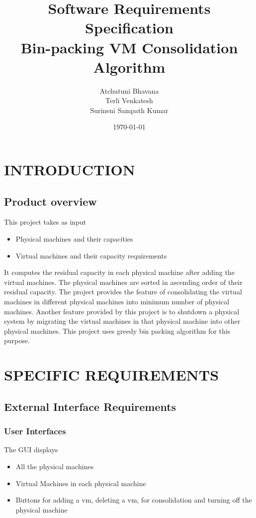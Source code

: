 \documentclass[a4paper,11pt]{article}
\title{Software Requirements Specification \\ Bin-packing VM Consolidation Algorithm}
\author{Atchutuni Bhavana \\ Terli Venkatesh \\ Surineni Sampath Kumar}
\date{\today}
\begin{document}
	\maketitle
	 \pagebreak 
	 \tableofcontents
	 \pagebreak 

	\section{INTRODUCTION}
		\subsection{Product overview}
		This project takes as  input 
		\begin{itemize}
		  \item Physical machines and their capacities
		  \item Virtual machines and their capacity requirements
		  
		\end{itemize} 
		It computes the residual capacity in each physical machine after adding the 
		virtual machines. The physical machines are sorted in ascending order of their residual capacity. 
		The project provides the feature of consolidating the virtual machines in different physical machines into 
		minimum number of physical machines. Another feature provided by this project is to shutdown a physical system
		by migrating the virtual machines in that physical machine into other physical machines. This project uses
		greedy bin packing algorithm for this purpose. \section{SPECIFIC REQUIREMENTS}
		\subsection{External Interface Requirements}
			\subsubsection{User Interfaces}
			The GUI displays 
			\begin{itemize}
				\item All the physical machines
				\item Virtual Machines in each physical machine
				\item Buttons for adding a vm, deleting a vm, for consolidation and turning off 
				the physical machine
			\end{itemize}
\end{document}
